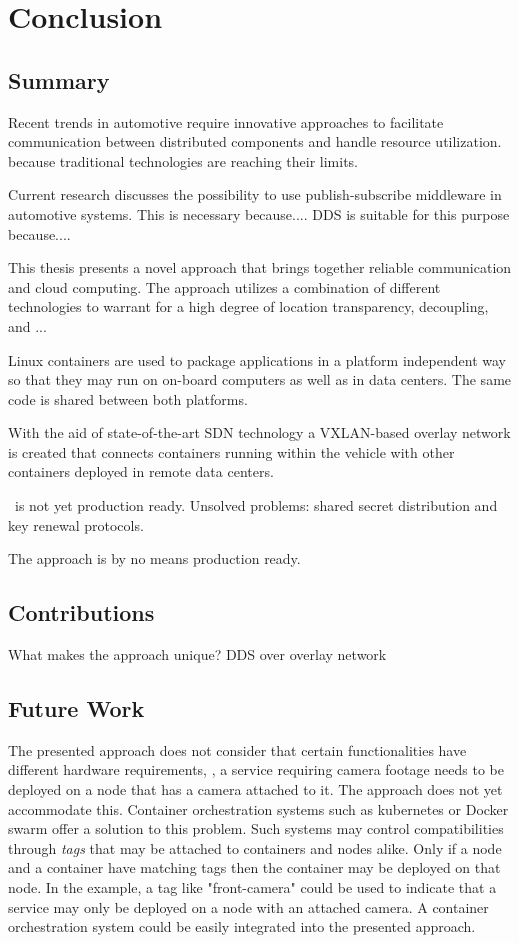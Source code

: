 
\chapter{Conclusion}\label{chapter:conclusion}

\section{Summary}

Recent trends in automotive require innovative approaches to facilitate communication between distributed components and handle resource utilization. because traditional technologies are reaching their limits. 

Current research discusses the possibility to use publish-subscribe middleware in automotive systems. This is necessary because.... DDS is suitable for this purpose because.... 

This thesis presents a novel approach that brings together reliable communication and cloud computing. The approach utilizes a combination of different technologies to warrant for a high degree of location transparency, decoupling,  and ...

Linux containers are used to package applications in a platform independent way so that they may run on on-board computers as well as in data centers. The same code is shared between both platforms.

With the aid of state-of-the-art SDN technology a VXLAN-based overlay network is created that connects containers running within the vehicle with other containers deployed in remote data centers. 


\wnet\ is not yet production ready. Unsolved problems: shared secret distribution and key renewal protocols.

The approach is by no means production ready.

\section{Contributions}

What makes the approach unique? DDS over overlay network


\section{Future Work}

The presented approach does not consider that certain functionalities have different hardware requirements, \ie , a service requiring camera footage needs to be deployed on a node that has a camera attached to it. The approach does not yet accommodate this. Container orchestration systems such as kubernetes or Docker swarm offer a solution to this problem. Such systems may control compatibilities through \emph{tags} that may be attached to containers and nodes alike. Only if a node and a container have matching tags then the container may be deployed on that node. In the example, a tag like "front-camera" could be used to indicate that a service may only be deployed on a node with an attached camera. A container orchestration system could be easily integrated into the presented approach. 


